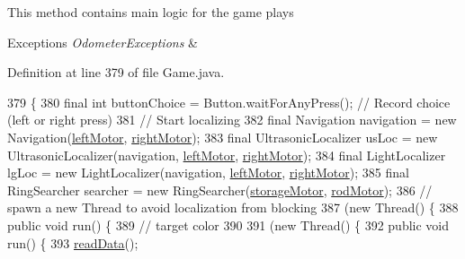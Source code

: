 This method contains main logic for the game plays


\begin{DoxyExceptions}{Exceptions}
{\em Odometer\+Exceptions} & \\
\hline
\end{DoxyExceptions}


Definition at line 379 of file Game.\+java.


\begin{DoxyCode}
379                                                                       \{
380     \textcolor{keyword}{final} \textcolor{keywordtype}{int} buttonChoice = Button.waitForAnyPress(); \textcolor{comment}{// Record choice (left or right press)}
381     \textcolor{comment}{// Start localizing}
382     \textcolor{keyword}{final} Navigation navigation = \textcolor{keyword}{new} Navigation(\hyperlink{enumca_1_1mcgill_1_1ecse211_1_1project_1_1_game_a7c673571bf50fdb6917a9d7bb671e003}{leftMotor}, \hyperlink{enumca_1_1mcgill_1_1ecse211_1_1project_1_1_game_a7a05fcf37c4435c32270776a427ba0d2}{rightMotor});
383     \textcolor{keyword}{final} UltrasonicLocalizer usLoc = \textcolor{keyword}{new} UltrasonicLocalizer(navigation, 
      \hyperlink{enumca_1_1mcgill_1_1ecse211_1_1project_1_1_game_a7c673571bf50fdb6917a9d7bb671e003}{leftMotor}, \hyperlink{enumca_1_1mcgill_1_1ecse211_1_1project_1_1_game_a7a05fcf37c4435c32270776a427ba0d2}{rightMotor});
384     \textcolor{keyword}{final} LightLocalizer lgLoc = \textcolor{keyword}{new} LightLocalizer(navigation, \hyperlink{enumca_1_1mcgill_1_1ecse211_1_1project_1_1_game_a7c673571bf50fdb6917a9d7bb671e003}{leftMotor}, 
      \hyperlink{enumca_1_1mcgill_1_1ecse211_1_1project_1_1_game_a7a05fcf37c4435c32270776a427ba0d2}{rightMotor});
385     \textcolor{keyword}{final} RingSearcher searcher = \textcolor{keyword}{new} RingSearcher(\hyperlink{enumca_1_1mcgill_1_1ecse211_1_1project_1_1_game_af3ba5407b115e9c6e07dffda576f29b7}{storageMotor}, 
      \hyperlink{enumca_1_1mcgill_1_1ecse211_1_1project_1_1_game_aeb41e5234fcb3b311385f39a07a24a54}{rodMotor});
386     \textcolor{comment}{// spawn a new Thread to avoid localization from blocking}
387     (\textcolor{keyword}{new} Thread() \{
388       \textcolor{keyword}{public} \textcolor{keywordtype}{void} run() \{
389         \textcolor{comment}{// target color}
390 
391         (\textcolor{keyword}{new} Thread() \{
392           \textcolor{keyword}{public} \textcolor{keywordtype}{void} run() \{
393             \hyperlink{enumca_1_1mcgill_1_1ecse211_1_1project_1_1_game_aff9431d27d78c8b228f468d8ad889a9a}{readData}();

\end{DoxyCode}

